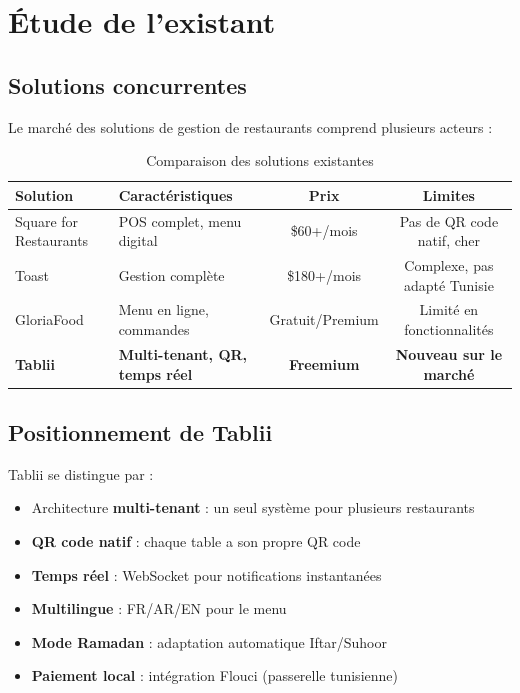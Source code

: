 \documentclass[12pt,a4paper]{report}
\begin{document}
\section{Étude de l'existant}

\subsection{Solutions concurrentes}

Le marché des solutions de gestion de restaurants comprend plusieurs acteurs :

\begin{table}[H]
    \centering
    \caption{Comparaison des solutions existantes}
    \label{tab:concurrents}
    \begin{tabularx}{\textwidth}{lXcc}
        \toprule
        \textbf{Solution} & \textbf{Caractéristiques} & \textbf{Prix} & \textbf{Limites} \\
        \midrule
        Square for Restaurants & POS complet, menu digital & \$60+/mois & Pas de QR code natif, cher \\
        Toast & Gestion complète & \$180+/mois & Complexe, pas adapté Tunisie \\
        GloriaFood & Menu en ligne, commandes & Gratuit/Premium & Limité en fonctionnalités \\
        \textbf{Tablii} & \textbf{Multi-tenant, QR, temps réel} & \textbf{Freemium} & \textbf{Nouveau sur le marché} \\
        \bottomrule
    \end{tabularx}
\end{table}

\subsection{Positionnement de Tablii}

Tablii se distingue par :
\begin{itemize}
    \item Architecture \textbf{multi-tenant} : un seul système pour plusieurs restaurants
    \item \textbf{QR code natif} : chaque table a son propre QR code
    \item \textbf{Temps réel} : WebSocket pour notifications instantanées
    \item \textbf{Multilingue} : FR/AR/EN pour le menu
    \item \textbf{Mode Ramadan} : adaptation automatique Iftar/Suhoor
    \item \textbf{Paiement local} : intégration Flouci (passerelle tunisienne)
\end{itemize}
\end{document}
